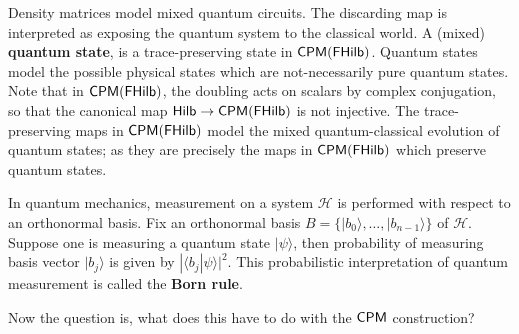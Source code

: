 Density matrices model mixed quantum circuits. The discarding map is interpreted as exposing the quantum system to the classical world. A (mixed) {\bf quantum state}, is a trace-preserving state in $\mathsf{CPM}(\mathsf{FHilb})$.  Quantum states model the possible physical states which are not-necessarily pure quantum states. Note that in $\mathsf{CPM}(\mathsf{FHilb})$, the doubling acts on scalars by complex conjugation, so that the canonical map $\mathsf{Hilb}\to \mathsf{CPM}(\mathsf{FHilb})$ is not injective.  The trace-preserving maps in $\mathsf{CPM}(\mathsf{FHilb})$ model the mixed quantum-classical evolution of quantum states; as they are precisely the maps in $\mathsf{CPM}(\mathsf{FHilb})$ which preserve quantum states.


%




In quantum mechanics, measurement on a system $\mathcal H$ is performed with respect to an orthonormal basis.  Fix an orthonormal basis $B=\{ |b_0\rangle,\ldots, |b_{n-1}\rangle \}$ of $\mathcal H$.  Suppose one is measuring a quantum state $|\psi\rangle$, then probability of measuring basis vector $| b_j\rangle $ is given by $| \langle b_j | \psi \rangle |^2$.  This probabilistic interpretation of quantum measurement is called the {\bf Born rule}.


Now the question is, what does this have to do with the $\mathsf{CPM}$ construction?


